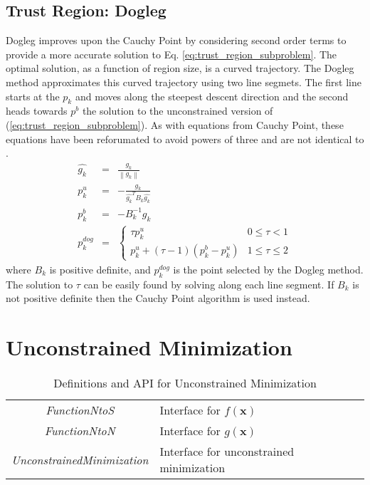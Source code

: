 \documentclass[peerreview,onecolumn]{IEEEtran}
\newcommand{\norm}[1]{\left\lVert#1\right\rVert}
\begin{document}
\subsection{Trust Region: Dogleg}
\label{section:dogleg}  

Dogleg improves upon the Cauchy Point by considering second order terms to provide a more accurate solution to Eq. \ref{eq:trust_region_subproblem}. The optimal solution, as a function of region size, is a curved trajectory. The Dogleg method approximates this curved trajectory using two line segmets. The first line starts at the $p_k$ and moves along the steepest descent direction and the second heads towards $p^b$ the solution to the unconstrained version of (\ref{eq:trust_region_subproblem}). As with equations from Cauchy Point, these equations have been reforumated to avoid powers of three and are not identical to \cite{numopt2006,IMM2004}.
\begin{eqnarray}
\hat{g_k} &=& \frac{g_k}{\norm{g_k}} \\
p^u_k &=& -\frac{g_k}{\hat{g_k}^T B_k \hat{g_k}} \\
p^b_k &=& -B^{-1}_k g_k \\
p^{dog}_k &=&
\begin{cases}
	\tau p^u_k & 0 \le \tau < 1 \\
	p^u_k + (\tau -1)(p^b_k-p^u_k) & 1 \le \tau \le 2
\end{cases}
\end{eqnarray}
where $B_k$ is positive definite, and $p^{dog}_k$ is the point selected by the Dogleg method. The solution to $\tau$ can be easily found by solving along each line segment. If $B_k$ is not positive definite then the Cauchy Point algorithm is used instead.

\section{Unconstrained Minimization}

\begin{table}[h]
\centering
\caption{\label{definitions:UM}Definitions and API for Unconstrained Minimization}
\begin{tabular}{cl}
\textit{FunctionNtoS} & Interface for $f(\bm{x})$ \\
\textit{FunctionNtoN} & Interface for $g(\bm{x})$ \\
\textit{UnconstrainedMinimization} & Interface for unconstrained minimization
\end{tabular}
\end{table}
\end{document}
